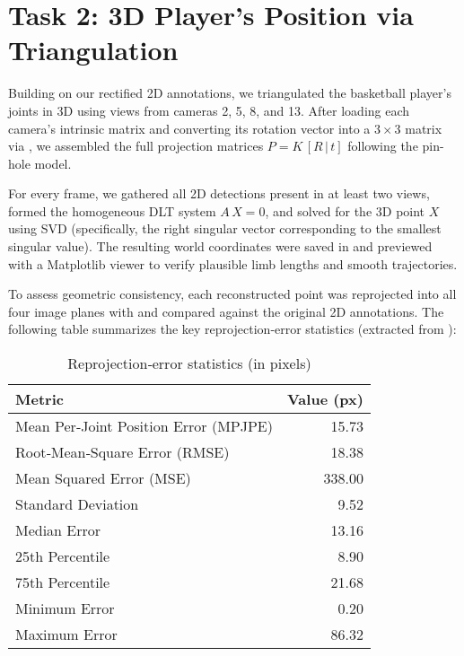 \documentclass[11pt,a4paper]{article}
\begin{document}
\section*{Task 2: 3D Player’s Position via Triangulation}

Building on our rectified 2D annotations, we triangulated the basketball player’s joints in 3D using views from cameras 2, 5, 8, and 13. After loading each camera’s intrinsic matrix and converting its rotation vector into a $3\times3$ matrix via , we assembled the full projection matrices $P = K\,[R\,|\,t]$ following the pin-hole model.  

For every frame, we gathered all 2D detections present in at least two views, formed the homogeneous DLT system $A\,X=0$, and solved for the 3D point $X$ using SVD (specifically, the right singular vector corresponding to the smallest singular value). The resulting world coordinates were saved in  and previewed with a Matplotlib viewer to verify plausible limb lengths and smooth trajectories.

To assess geometric consistency, each reconstructed point was reprojected into all four image planes with  and compared against the original 2D annotations. The following table summarizes the key reprojection‐error statistics (extracted from ):

\begin{table}[h]
  \centering
  \caption{Reprojection‐error statistics (in pixels)}
  \label{tab:reproj-errors}
  \begin{tabular}{l r}
    \toprule
    \textbf{Metric}           & \textbf{Value (px)} \\
    \midrule
    Mean Per‐Joint Position Error (MPJPE) & 15.73 \\
    Root‐Mean‐Square Error (RMSE)         & 18.38 \\
    Mean Squared Error (MSE)             & 338.00 \\
    Standard Deviation                   & 9.52  \\
    Median Error                         & 13.16 \\
    25th Percentile                      & 8.90  \\
    75th Percentile                      & 21.68 \\
    Minimum Error                        & 0.20  \\
    Maximum Error                        & 86.32 \\
    \bottomrule
  \end{tabular}
\end{table}
\end{document}
